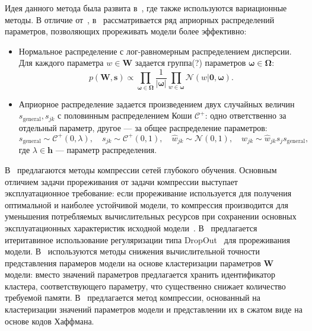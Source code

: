 Идея данного метода была развита в~\cite{bayes_compr}, где также используются вариационные методы.  В отличие от~\cite{nips}, в~\cite{bayes_compr} рассматривается ряд априорных распределений параметров, позволяющих прореживать модели более эффективно:
\begin{itemize}
\item Нормальное распределение с лог-равномерным распределением дисперсии. Для каждого параметра $w \in \mathbf{W}$ задается группа(?) параметров $\boldsymbol{\omega} \in \boldsymbol{\Omega}$:
\[
    p(\mathbf{W}, \mathbf{s}) \propto \prod_{\boldsymbol{\omega} \in \boldsymbol{\Omega}} \frac{1}{|\boldsymbol{\omega}|}\prod_{w \in \boldsymbol{\omega}}\mathcal{N}(w|\mathbf{0}, \boldsymbol{\omega}).
\]
\item Априорное распределение задается произведением двух случайных величин ${s}_{\text{general}}, {s}_{jk}$ с половинным распределением Коши $\mathcal{C}^{+}$: одно ответственно за отдельный параметр, другое --- за общее распределение параметров:
\[
    {s}_{\text{general}} \sim \mathcal{C}^{+}(0, \lambda), \quad  {s}_{jk} \sim \mathcal{C}^{+}(0,1), \quad \hat{w}_{jk} \sim \mathcal{N}(0,1), \quad w_{jk} \sim \hat{w}_{jk}s_j  {s}_{\text{general}},
\]
где $\lambda \in \mathbf{h}$ --- параметр распределения.

\end{itemize}

В~\cite{weight_quantization, weight_quantization2,nvidia_prune} предлагаются методы компрессии сетей глубокого обучения. Основным отличием задачи прореживания от задачи компрессии выступает эксплуатационное требование: если прореживание используется для получения оптимальной и наиболее устойчивой модели, то компрессия производится для уменьшения потребляемых вычислительных ресурсов при сохранении основных эксплуатационных характеристик исходной модели~\cite{weight_quantization2}.
В~\cite{nvidia_prune}
предлагается итеритавиное использование регуляризации типа DropOut~\cite{dropout} для прореживания модели. 
В~\cite{weight_quantization, weight_quantization2} используются методы снижения вычислительной точности представления парамеров модели на основе кластеризации параметров $\mathbf{W}$ модели: вместо значений параметров предлагается хранить идентификатор кластера, соответствующего параметру, что существенно снижает количество требуемой памяти.
В~\cite{weight_quantization2} предлагается метод компрессии, основанный на кластеризации значений параметров модели и представлении их в сжатом виде на основе кодов Хаффмана.


